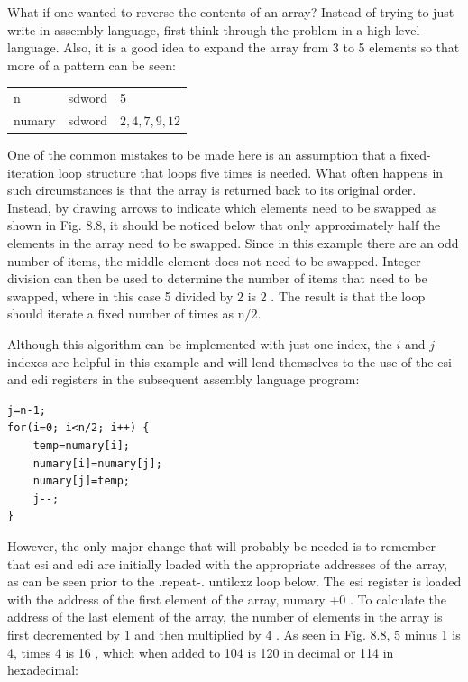 \documentclass[10pt]{book}
\begin{document}
\begin{center}
\begin{center}
\begin{center}
What if one wanted to reverse the contents of an array? Instead of trying to just write in assembly language, first think through the problem in a high-level language. Also, it is a good idea to expand the array from 3 to 5 elements so that more of a pattern can be seen:

\begin{center}
\begin{tabular}{lll}
n & sdword & 5 \\
numary & sdword & $2,4,7,9,12$ \\
\end{tabular}
\end{center}

One of the common mistakes to be made here is an assumption that a fixed-iteration loop structure that loops five times is needed. What often happens in such circumstances is that the array is returned back to its original order. Instead, by drawing arrows to indicate which elements need to be swapped as shown in Fig. 8.8, it should be noticed below that only approximately half the elements in the array need to be swapped. Since in this example there are an odd number of items, the middle element does not need to be swapped. Integer division can then be used to determine the number of items that need to be swapped, where in this case 5 divided by 2 is 2 . The result is that the loop should iterate a fixed number of times as $\mathrm{n} / 2$.

Although this algorithm can be implemented with just one index, the $i$ and $j$ indexes are helpful in this example and will lend themselves to the use of the esi and edi registers in the subsequent assembly language program:

\begin{verbatim}
j=n-1;
for(i=0; i<n/2; i++) {
    temp=numary[i];
    numary[i]=numary[j];
    numary[j]=temp;
    j--;
}
\end{verbatim}

However, the only major change that will probably be needed is to remember that esi and edi are initially loaded with the appropriate addresses of the array, as can be seen prior to the .repeat-. untilcxz loop below. The esi register is loaded with the address of the first element of the array, numary +0 . To calculate the address of the last element of the array, the number of elements in the array is first decremented by 1 and then multiplied by 4 . As seen in Fig. 8.8, 5 minus 1 is 4, times 4 is 16 , which when added to 104 is 120 in decimal or 114 in hexadecimal:


\end{center}
\end{center}
\end{center}
\end{document}
